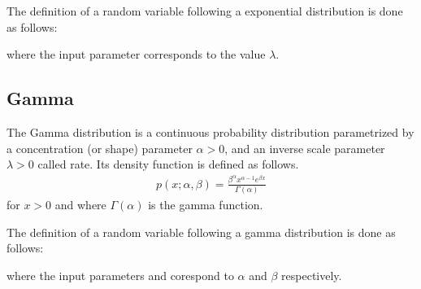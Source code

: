 \documentclass[letterpaper,10pt,english]{sphinxmanual}
\begin{document}
The definition of a random variable following a exponential distribution is done as follows:

\begin{sphinxVerbatim}[commandchars=\\\{\}]
  


  
\end{sphinxVerbatim}

where the input parameter  corresponds to the value \(\lambda\).


\subsection{Gamma}
\label{\detokenize{notes/guidemodels:gamma}}
The Gamma distribution is a continuous probability distribution parametrized by a concentration (or shape)
parameter \(\alpha>0\), and an inverse scale parameter \(\lambda>0\) called rate. Its density function is
defined as follows.
\begin{equation*}
\begin{split}p(x;\alpha, \beta) = \frac{\beta^\alpha x^{\alpha - 1} e^{\beta x}}{\Gamma(\alpha)}\end{split}
\end{equation*}
for \(x > 0\) and where \(\Gamma(\alpha)\) is the gamma function.

The definition of a random variable following a gamma distribution is done as follows:

\begin{sphinxVerbatim}[commandchars=\\\{\}]
   
\end{sphinxVerbatim}

where the input parameters  and  corespond to  \(\alpha\) and \(\beta\) respectively.
\end{document}
